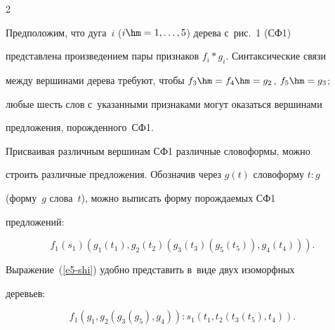 \begin{multicols}{2}
     

     Предположим, что дуга~$i$ ($i \hm= 1, \ldots, 5$) дерева с~рис.~1 (СФ1) 

представлена произведением пары признаков $f_i*g_i$. Синтаксические связи 

между вершинами дерева требуют, чтобы $f_3\hm=f_4\hm =g_2$, $f_5\hm=g_3$; 

любые шесть слов с~указанными признаками могут оказаться вершинами 

предложения, порожденного~СФ1.

     

     Присваивая различным вершинам СФ1 различные словоформы, можно 

строить различные предложения. Обозначив через $g(t)$ словоформу $t:g$ 

(форму~$g$ слова~$t$), можно выписать форму по\-рож\-да\-емых СФ1 

предложений:



\vspace*{3pt} 



\noindent

     \begin{equation}

               f_1(s_1)\left(g_1(t_1), g_2(t_2)\left(g_3(t_3)(g_5(t_5)), 

g_4(t_4)\right)\right).

               \label{e5-shi}

               \end{equation}

Выражение~(\ref{e5-shi}) удобно представить в~виде двух изоморфных 

деревьев:



\vspace*{3pt}



\noindent

\begin{equation}

f_1

\left(g_1, g_2\left(g_3(g_5), g_4\right)\right):

s_1\left(t_1, t_2\left(t_3(t_5), 

t_4\right)\right).

               \label{e6-shi}

               \end{equation}


\end{multicols}
